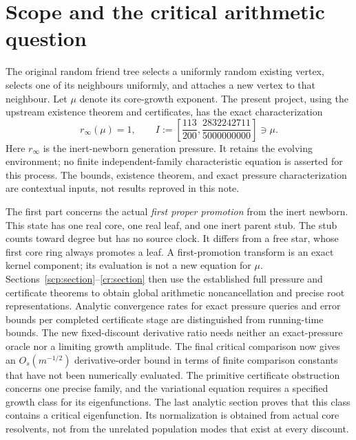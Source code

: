 \documentclass[11pt]{article}
\theoremstyle{remark}
\begin{document}
\begin{abstract}
kernel has spectral and essential spectral radius one at criticality,
excluding a compact-operator reduction on its original supremum-norm
space. A directional disagreement estimate nevertheless gives a uniform
comparison with the fixed inert resolvent. It proves critical divergence,
a bounded positive genealogical eigenfunction, and attainment of the
core-growth variational equation. In particular, the original mean core
count is bounded above and below by positive constants times $n^\mu$.
The signed renewal germ has a genuine critical boundary value along the
positive real axis. Neither irrationality nor transcendence of the original exponent
is proved: a critical arithmetic specialization with sufficiently small
nonzero values remains missing.
\end{abstract}

\section{Scope and the critical arithmetic question}

The original random friend tree selects a uniformly random existing
vertex, selects one of its neighbours uniformly, and attaches a new
vertex to that neighbour\cite{KR}. Let $\mu$ denote its core-growth
exponent. The present project\cite{Long}, using the upstream existence
theorem and certificates\cite{Uzay}, has the exact characterization
\[
 r_\infty(\mu)=1,\qquad
 I:=\left[\frac{113}{200},\frac{2832242711}{5000000000}\right]
 \ni\mu.
\]
Here $r_\infty$ is the inert-newborn generation pressure. It retains the
evolving environment; no finite independent-family characteristic
equation is asserted for this process. The bounds, existence theorem,
and exact pressure characterization are contextual inputs, not results
reproved in this note.

The first part concerns the actual \emph{first proper
promotion} from the inert newborn. This state has one real core, one
real leaf, and one inert parent stub. The stub counts toward degree but
has no source clock. It differs from a free star, whose first core ring
always promotes a leaf. A first-promotion transform is an exact kernel
component; its evaluation is not a new equation for $\mu$.
Sections~\ref{scp:section}--\ref{cr:section} then use the established
full pressure and certificate theorems to obtain global arithmetic
noncancellation and precise root representations. Analytic convergence
rates for exact pressure queries and error bounds per completed
certificate stage are distinguished from running-time bounds. The new
fixed-discount derivative ratio needs neither an exact-pressure oracle
nor a limiting growth amplitude. The final critical comparison now gives
an $O_s(m^{-1/2})$ derivative-order bound in terms of finite comparison
constants that have not been numerically evaluated.
The primitive certificate obstruction concerns one
precise family, and the variational equation requires a specified growth
class for its eigenfunctions.
The last analytic section proves that this class contains a critical
eigenfunction. Its normalization is obtained from actual core resolvents,
not from the unrelated population modes that exist at every discount.
\end{document}
